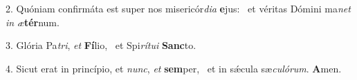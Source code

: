 2. Quóniam confirmáta est super nos misericór\textit{di}\textit{a} \textbf{e}jus: \ast\  et véritas Dómini ma\textit{net} \textit{in} \textit{æ}\textbf{tér}num.\

3. Glória Pa\textit{tri}, \textit{et} \textbf{Fí}lio, \ast\  et Spi\textit{rí}\textit{tu}\textit{i} \textbf{Sanc}to.\

4. Sicut erat in princípio, et \textit{nunc}, \textit{et} \textbf{sem}per, \ast\  et in sǽcula sæ\textit{cu}\textit{ló}\textit{rum}. \textbf{A}men.\

